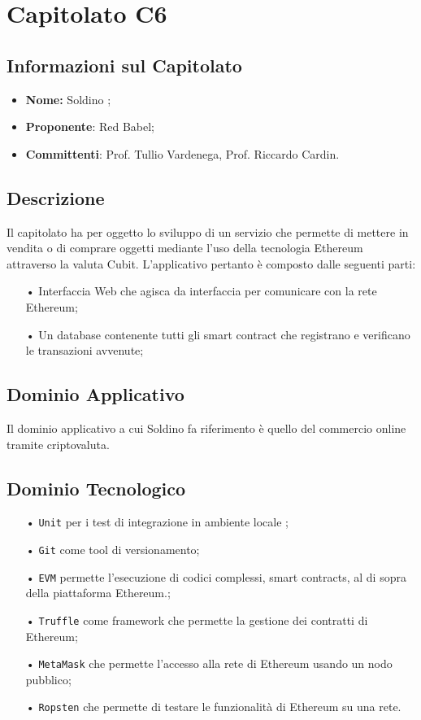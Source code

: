 \section{Capitolato C6}
\subsection{Informazioni sul Capitolato}
\begin{itemize}
	\item \textbf{Nome:} Soldino ;
	\item \textbf{Proponente}: Red Babel;
	\item \textbf{Committenti}: Prof. Tullio Vardenega, Prof. Riccardo Cardin.
\end{itemize}

\subsection{Descrizione}
Il capitolato ha per oggetto lo sviluppo di un servizio che permette di mettere in vendita o di comprare oggetti mediante l'uso della tecnologia Ethereum attraverso la valuta Cubit. L'applicativo pertanto è composto dalle seguenti parti: 

\begin{itemize}

\item[•] Interfaccia Web che agisca da interfaccia per comunicare con la rete Ethereum;
\item[•] Un database contenente tutti gli smart contract che registrano e verificano le transazioni avvenute;

\end{itemize}

\subsection{Dominio Applicativo}
Il dominio applicativo a cui Soldino fa riferimento è quello del commercio online tramite criptovaluta. 

\subsection{Dominio Tecnologico}
\begin{itemize}

\item[•] \texttt{Unit} per i test di integrazione in ambiente locale ;
\item[•] \texttt{Git} come tool di versionamento;
\item[•] \texttt{EVM} permette l’esecuzione di codici complessi, smart contracts, al di sopra della piattaforma Ethereum.;
\item[•] \texttt{Truffle} come framework che permette la gestione dei contratti di Ethereum;
\item[•] \texttt{MetaMask} 
che permette l'accesso alla rete di Ethereum usando un nodo pubblico; 
\item[•] \texttt{Ropsten} che permette di testare le funzionalità di Ethereum su una rete. 

\end{itemize}

